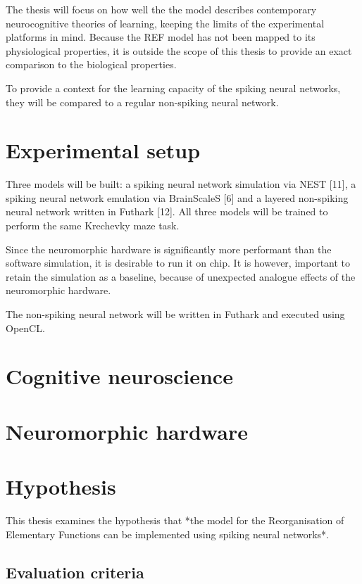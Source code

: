 \documentclass[report.tex]{subfiles}
\begin{document}
The thesis will focus on how well the the model describes contemporary neurocognitive theories of learning, keeping the limits of the experimental platforms in mind.
Because the REF model has not been mapped to its physiological properties, it is outside the scope of this thesis to provide an exact comparison to the biological properties.

To provide a context for the learning capacity of the spiking neural networks, they will be compared to a regular non-spiking neural network.

\section{Experimental setup}
Three models will be built: a spiking neural network simulation via NEST [11], a spiking neural network emulation via BrainScaleS [6] and a layered non-spiking neural network written in Futhark [12].
All three models will be trained to perform the same Krechevky maze task.

Since the neuromorphic hardware is significantly more performant than the software simulation, it is desirable to run it on chip.
It is however, important to retain the simulation as a baseline, because of unexpected analogue effects of the neuromorphic hardware.

The non-spiking neural network will be written in Futhark and executed using OpenCL.
\section{Cognitive neuroscience}
\section{Neuromorphic hardware}
\section{Hypothesis} \label{sec:hypothesis}
This thesis examines the hypothesis that *the model for the Reorganisation of Elementary Functions can be implemented using spiking neural networks*.
\subsection{Evaluation criteria} \label{sec:hypothesis-criteria}
\end{document}
